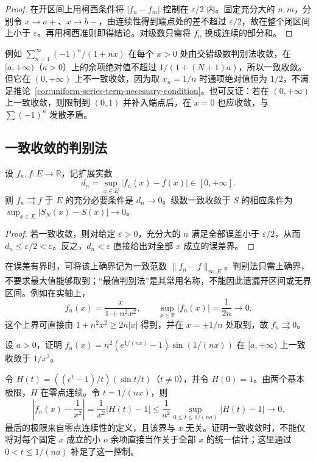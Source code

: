 \begin{proof}
在开区间上用柯西条件将 $|f_n-f_m|$ 控制在 $\varepsilon/2$ 内。固定充分大的 $n,m$，分别令 $x\to a+$、$x\to b-$，由连续性得到端点处的差不超过 $\varepsilon/2$，故在整个闭区间上小于 $\varepsilon$。再用柯西准则即得结论。对级数只需将 $f_n$ 换成连续的部分和。
\end{proof}

例如 $\sum_{n=1}^\infty(-1)^n/(1+nx)$ 在每个 $x>0$ 处由交错级数判别法收敛，在 $[a,+\infty)$（$a>0$）上的余项绝对值不超过 $1/(1+(N+1)a)$，所以一致收敛。但它在 $(0,+\infty)$ 上不一致收敛，因为取 $x_n=1/n$ 时通项绝对值恒为 $1/2$，不满足推论~\ref{cor:uniform-series-term-necessary-condition}。也可反证：若在 $(0,+\infty)$ 上一致收敛，则限制到 $(0,1)$ 并补入端点后，在 $x=0$ 也应收敛，与 $\sum(-1)^n$ 发散矛盾。

\subsection{一致收敛的判别法}
\label{subsec:uniform-convergence-tests}

\begin{theorem}[上确界判别法]
\label{thm:uniform-convergence-supremum-test}
设 $f_n,f:E\to\mathbb R$，记扩展实数
\[
    d_n=\sup_{x\in E}|f_n(x)-f(x)|\in[0,+\infty].
\]
则 $f_n\rightrightarrows f$ 于 $E$ 的充分必要条件是 $d_n\to0$。级数一致收敛于 $S$ 的相应条件为 $\sup_{x\in E}|S_N(x)-S(x)|\to0$。
\end{theorem}

\begin{proof}
若一致收敛，则对给定 $\varepsilon>0$，充分大的 $n$ 满足全部误差小于 $\varepsilon/2$，从而 $d_n\leq\varepsilon/2<\varepsilon$。反之，$d_n<\varepsilon$ 直接给出对全部 $x$ 成立的误差界。
\end{proof}

在误差有界时，可将该上确界记为一致范数 $\|f_n-f\|_{\infty,E}$。判别法只需上确界，不要求最大值能够取到；“最值判别法”是其常用名称，不能因此遗漏开区间或无界区间。例如在实轴上，
\[
    f_n(x)=\frac{x}{1+n^2x^2},\qquad
    \sup_{x\in\mathbb R}|f_n(x)|=\frac1{2n}\longrightarrow0.
\]
这个上界可直接由 $1+n^2x^2\geq2n|x|$ 得到，并在 $x=\pm1/n$ 处取到，故 $f_n\rightrightarrows0$。

\begin{example}
\label{ex:uniform-composite-exponential-limit}
设 $a>0$，证明 $f_n(x)=n^2(e^{1/(nx)}-1)\sin(1/(nx))$ 在 $[a,+\infty)$ 上一致收敛于 $1/x^2$。
\end{example}

\begin{solve}
令 $H(t)=((e^t-1)/t)(\sin t/t)$（$t\neq0$），并令 $H(0)=1$。由两个基本极限，$H$ 在零点连续。令 $t=1/(nx)$，则
\[
    \left|f_n(x)-\frac1{x^2}\right|
       =\frac1{x^2}|H(t)-1|
       \leq\frac1{a^2}\sup_{0\leq t\leq1/(na)}|H(t)-1|
       \longrightarrow0.
\]
最后的极限来自零点连续性的定义，且该界与 $x$ 无关。证明一致收敛时，不能仅将对每个固定 $x$ 成立的小 $o$ 余项直接当作关于全部 $x$ 的统一估计；这里通过 $0<t\leq1/(na)$ 补足了这一控制。
\end{solve}

